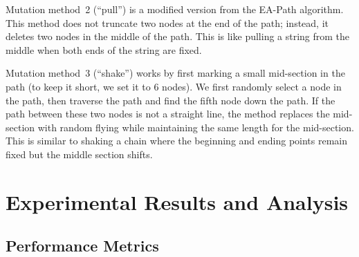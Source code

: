 Mutation method~2 (``pull'') is a modified version from the EA-Path algorithm. This method does not truncate two nodes at the end of the path; instead, it deletes two nodes in the middle of the path. This is like pulling a string from the middle when both ends of the string are fixed.

Mutation method~3 (``shake'') works by first marking a small mid-section in the path (to keep it short, we set it to 6 nodes). We first randomly select a node in the path, then traverse the path and find the fifth node down the path. If the path between these two nodes is not a straight line, the method replaces the mid-section with random flying while maintaining the same length for the mid-section. This is similar to shaking a chain where the beginning and ending points remain fixed but the middle section shifts.



\section{Experimental Results and Analysis}

\subsection{Performance Metrics}

